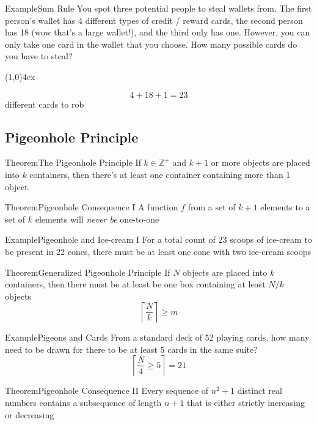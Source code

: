 \documentclass{MathNotes}
\newenvironment{example}[1]{\begin{BlueBox}{Example}{#1}}{\end{BlueBox}}
\newenvironment{theorem}[1]{\begin{GrayBox}{Theorem}{#1}}{\end{GrayBox}}
\newcommand{\br}{
	\begin{center}
		\line(1,0){4ex}
	\end{center}
}
\begin{document}
\begin{example}{Sum Rule}
	You spot three potential people to steal wallets from. The first person's
	wallet has 4 different types of credit / reward cards, the second person
	has 18 (wow that's a large wallet!), and the third only has one. However,
	you can only take one card in the wallet that you choose. How many possible
	cards do you have to steal?
	\br
	\[4+18+1=23\]
	different cards to rob 
\end{example}

\subsection{Pigeonhole Principle}
\begin{multicols}{2}
	\begin{theorem}{The Pigeonhole Principle}
		If $k\in\mathbb{Z}^+$ and $k+1$ or more objects are placed into $k$
		containers, then there's at least one container containing more than 1
		object.
	\end{theorem}
	\begin{theorem}{Pigeonhole Consequence I}
		A function $f$ from a set of $k+1$ elements to a set of $k$ elements
		will \textit{never be} one-to-one
	\end{theorem}
\end{multicols}

\begin{example}{Pigeonhole and Ice-cream I}
	For a total count of 23 scoops of ice-cream to be present in 22 cones,
	there must be at least one cone with two ice-cream scoops
\end{example}

\begin{multicols}{2}
	\begin{theorem}{Generalized Pigeonhole Principle}
		If $N$ objects are placed into $k$ containers, then there must be at least
		be one box containing at least $N/k$ objects
		\[\left\lceil\frac{N}{k}\right\rceil\geq m\]
	\end{theorem}
	\begin{example}{Pigeons and Cards}
		From a standard deck of 52 playing cards, how many need to be drawn for
		there to be at least 5 cards in the same suite?
		\[\left\lceil\frac{N}{4}\geq5\right\rceil=21\]
	\end{example}
\end{multicols}
\begin{theorem}{Pigeonhole Consequence II}
	Every sequence of $n^2+1$ distinct real numbers contains a subsequence
	of length $n+1$ that is either strictly increasing or decreasing
\end{theorem}
\end{document}
